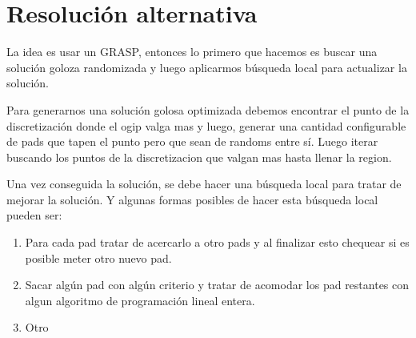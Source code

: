 \newpage
\section{Resoluci\'on alternativa}
La idea es usar un GRASP, entonces lo primero que hacemos es buscar una soluci\'on goloza randomizada y luego aplicarmos b\'usqueda local para actualizar la soluci\'on. 

Para generarnos una soluci\'on golosa optimizada debemos encontrar el punto de la discretizaci\'on donde el ogip valga mas y luego, generar una cantidad configurable de pads que tapen el punto pero que sean de randoms entre s\'i. Luego iterar buscando los puntos de la discretizacion que valgan mas hasta llenar la region.

Una vez conseguida la soluci\'on, se debe hacer una b\'usqueda local para tratar de mejorar la soluci\'on. Y algunas formas posibles de hacer esta b\'usqueda local pueden ser:

\begin{enumerate}
\item Para cada pad tratar de acercarlo a otro pads y al finalizar esto chequear si es posible meter otro nuevo pad.
\item Sacar alg\'un pad con alg\'un criterio y tratar de acomodar los pad restantes con algun algoritmo de programaci\'on lineal entera.
\item Otro
\end{enumerate}